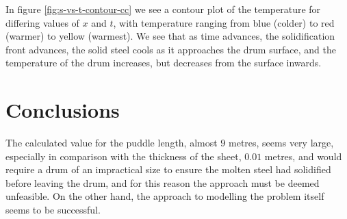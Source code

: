 \documentclass{report}
\begin{document}
In figure \ref{fig:s-vs-t-contour-cc} we see a contour plot of the temperature for differing values of $x$ 
and $t$, with temperature ranging from blue (colder) to red (warmer) to yellow (warmest). We see that as 
time advances, the solidification front advances, the solid steel cools as it approaches the drum surface, 
and the temperature of the drum increases, but decreases from the surface inwards.\bigskip













\chapter{Conclusions}

The calculated value for the puddle length, almost $9$ metres, seems very large, especially in comparison 
with the thickness of the sheet, $0.01$ metres, and would require a drum of an impractical size to ensure 
the molten steel had solidified before leaving the drum, and for this reason the approach must be deemed 
unfeasible. On the other hand, the approach to modelling the problem itself seems to be successful.\bigskip














{}
\end{document}
